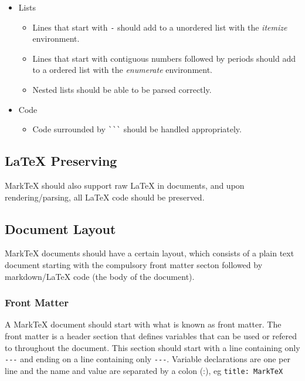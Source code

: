 \documentclass[10pt, a4paper]{article}
\begin{document}
\begin{itemize}
\begin{itemize}
        \item \verb![link-url]! should convert to \verb!\url{link-url}!.
        \item \verb![link-url](link-text)! should convert to \newline \verb!\href{link-url}{link-text}!.
        \item URLs that are written without any wrapping should attempt to be parse to links.
        \item Links should also work with mailto links.
    \end{itemize}
    \item Lists
    \begin{itemize}
        \item Lines that start with \verb!-! should add to a unordered list with the \textit{itemize} environment.
        \item Lines that start with contiguous numbers followed by periods should add to a ordered list with the \textit{enumerate} environment.
        \item Nested lists should be able to be parsed correctly.
    \end{itemize}
    \item Code
    \begin{itemize}
        \item Code surrounded by \texttt{\`}\texttt{\`}\texttt{\`} should be handled appropriately.
    \end{itemize}
\end{itemize}

\subsection{\LaTeX{} Preserving}
MarkTeX should also support raw \LaTeX{} in documents, and upon rendering/par\-sing, all \LaTeX{} code should be preserved.

\subsection{Document Layout}
MarkTeX documents should have a certain layout, which consists of a plain text document starting with the compulsory front matter secton followed by markdown/\LaTeX{} code (the body of the document).
\subsubsection{Front Matter}
A MarkTeX document should start with what is known as front matter. The front matter is a header section that defines variables that can be used or refered to throughout the document. This section should start with a line containing only \verb!---! and ending on a line containing only \verb!---!. Variable declarations are one per line and the name and value are separated by a colon (:), eg \verb!title: MarkTeX!
\end{document}
